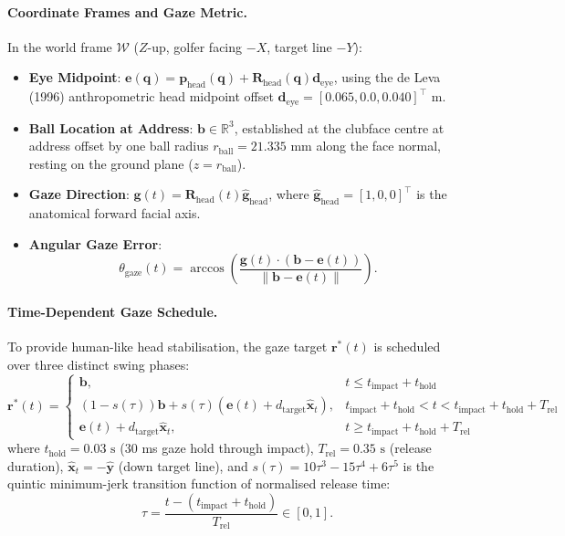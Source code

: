 \documentclass[11pt]{article}
\begin{document}
\paragraph{Coordinate Frames and Gaze Metric.}
In the world frame $\mathcal{W}$ ($Z$-up, golfer facing $-X$, target line $-Y$):
\begin{itemize}
  \item \textbf{Eye Midpoint}: $\mathbf{e}(\mathbf{q}) = \mathbf{p}_{\mathrm{head}}(\mathbf{q}) + \mathbf{R}_{\mathrm{head}}(\mathbf{q}) \mathbf{d}_{\mathrm{eye}}$, using the de Leva (1996) anthropometric head midpoint offset $\mathbf{d}_{\mathrm{eye}} = [0.065, 0.0, 0.040]^\top\text{ m}$.
  \item \textbf{Ball Location at Address}: $\mathbf{b} \in \mathbb{R}^3$, established at the clubface centre at address offset by one ball radius $r_{\mathrm{ball}} = 21.335\text{ mm}$ along the face normal, resting on the ground plane ($z = r_{\mathrm{ball}}$).
  \item \textbf{Gaze Direction}: $\mathbf{g}(t) = \mathbf{R}_{\mathrm{head}}(t) \hat{\mathbf{g}}_{\mathrm{head}}$, where $\hat{\mathbf{g}}_{\mathrm{head}} = [1, 0, 0]^\top$ is the anatomical forward facial axis.
  \item \textbf{Angular Gaze Error}:
    \begin{equation}
      \theta_{\mathrm{gaze}}(t) = \arccos\left( \frac{\mathbf{g}(t) \cdot (\mathbf{b} - \mathbf{e}(t))}{\|\mathbf{b} - \mathbf{e}(t)\|} \right) .
    \end{equation}
\end{itemize}

\paragraph{Time-Dependent Gaze Schedule.}
To provide human-like head stabilisation, the gaze target $\mathbf{r}^*(t)$ is scheduled over three distinct swing phases:
\begin{equation}
  \mathbf{r}^*(t) = 
  \begin{cases}
    \mathbf{b}, & t \le t_{\mathrm{impact}} + t_{\mathrm{hold}} \\
    (1 - s(\tau)) \mathbf{b} + s(\tau) \left( \mathbf{e}(t) + d_{\mathrm{target}} \hat{\mathbf{x}}_t \right), & t_{\mathrm{impact}} + t_{\mathrm{hold}} < t < t_{\mathrm{impact}} + t_{\mathrm{hold}} + T_{\mathrm{rel}} \\
    \mathbf{e}(t) + d_{\mathrm{target}} \hat{\mathbf{x}}_t, & t \ge t_{\mathrm{impact}} + t_{\mathrm{hold}} + T_{\mathrm{rel}}
  \end{cases}
\end{equation}
where $t_{\mathrm{hold}} = 0.03\text{ s}$ (30 ms gaze hold through impact), $T_{\mathrm{rel}} = 0.35\text{ s}$ (release duration), $\hat{\mathbf{x}}_t = -\hat{\mathbf{y}}$ (down target line), and $s(\tau) = 10\tau^3 - 15\tau^4 + 6\tau^5$ is the quintic minimum-jerk transition function of normalised release time:
\begin{equation}
  \tau = \frac{t - (t_{\mathrm{impact}} + t_{\mathrm{hold}})}{T_{\mathrm{rel}}} \in [0, 1] .
\end{equation}
\end{document}
